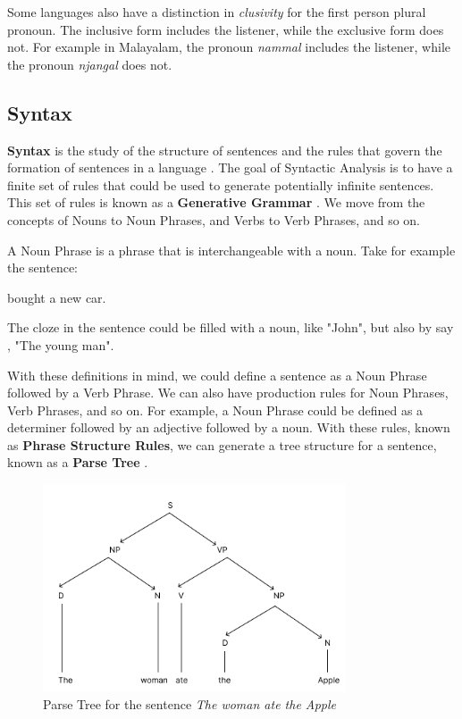 Some languages also have a distinction in \textit{clusivity} for the first person plural pronoun. The inclusive form includes the listener, while the exclusive form does not.
For example in Malayalam, the pronoun \textit{nammal} includes the listener, while the pronoun \textit{njangal} does not.

\subsection{Syntax}
\textbf{Syntax} is the study of the structure of sentences and the rules that govern the formation of sentences in a language \cite{trask2007language}.
The goal of Syntactic Analysis is to have a finite set of rules that could be used to generate potentially infinite sentences. This set of rules is known as 
a \textbf{Generative Grammar} \cite{yule2020StudyLanguage}. We move from the concepts of Nouns to Noun Phrases, and Verbs to Verb Phrases, and so on.

A Noun Phrase is a phrase that is interchangeable with a noun. Take for example the sentence:

\begin{center}
    \underline{\hspace{2cm}} bought a new car.
\end{center}

The cloze in the sentence could be filled with a noun, like "John", but also by say , "The young man".

With these definitions in mind, we could define a sentence as a Noun Phrase followed by a Verb Phrase. We can also have production rules for 
Noun Phrases, Verb Phrases, and so on. For example, a Noun Phrase could be defined as a determiner followed by an adjective followed by a noun.
With these rules, known as \textbf{Phrase Structure Rules}, we can generate a tree structure for a sentence, known as a \textbf{Parse Tree} \cite{jm3}.

\begin{figure}
    \centering
    \includegraphics[width=0.8\textwidth]{figures/syntactic_parse_tree.png}
    \caption{Parse Tree for the sentence \textit{The woman ate the Apple}}
    \label{fig:parse_tree}
\end{figure}


